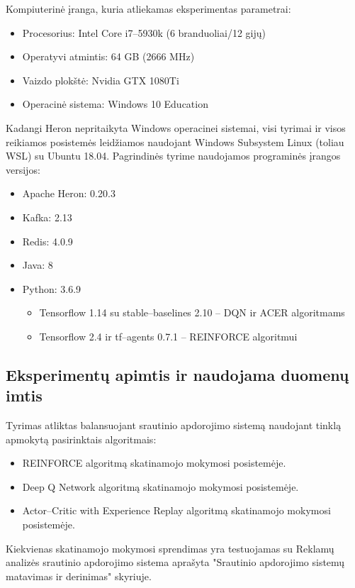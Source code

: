 \documentclass{VUMIFPSbakalaurinis}
\begin{document}
Kompiuterinė įranga, kuria atliekamas eksperimentas parametrai:
\begin{itemize}
    \item Procesorius: Intel Core i7–5930k (6 branduoliai/12 gijų)
    \item Operatyvi atmintis: 64 GB (2666 MHz)
    \item Vaizdo plokštė: Nvidia GTX 1080Ti
    \item Operacinė sistema: Windows 10 Education
\end{itemize}

Kadangi Heron nepritaikyta Windows operacinei sistemai, visi tyrimai ir visos reikiamos posistemės leidžiamos naudojant Windows Subsystem Linux (toliau WSL) su Ubuntu 18.04.
\newpage
Pagrindinės tyrime naudojamos programinės įrangos versijos:
\begin{itemize}
    \item Apache Heron: 0.20.3
    \item Kafka: 2.13
    \item Redis: 4.0.9
    \item Java: 8
    \item Python: 3.6.9
    \begin{itemize}
        \item Tensorflow 1.14 su stable–baselines 2.10 – DQN ir ACER algoritmams
        \item Tensorflow 2.4 ir tf–agents 0.7.1 – REINFORCE algoritmui
    \end{itemize}
\end{itemize}
\subsection{Eksperimentų apimtis ir naudojama duomenų imtis}

Tyrimas atliktas balansuojant srautinio apdorojimo sistemą naudojant tinklą apmokytą pasirinktais algoritmais:
\begin{itemize}
        \item REINFORCE algoritmą skatinamojo mokymosi posistemėje.
        \item Deep Q Network algoritmą skatinamojo mokymosi posistemėje.
        \item Actor–Critic with Experience Replay algoritmą skatinamojo mokymosi posistemėje.
\end{itemize}

Kiekvienas skatinamojo mokymosi sprendimas yra testuojamas su Reklamų analizės srautinio apdorojimo sistema aprašyta "Srautinio apdorojimo sistemų matavimas ir derinimas" skyriuje.
\end{document}
